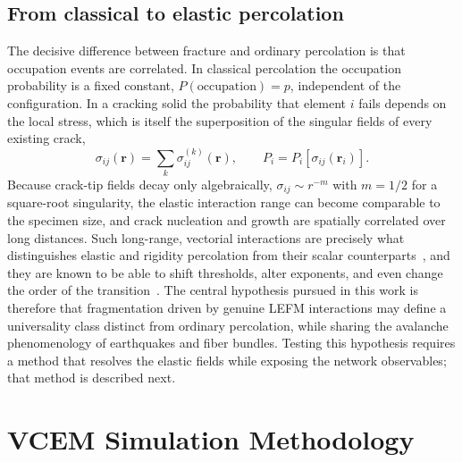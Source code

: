 \documentclass[preprint,12pt]{elsarticle}
\begin{document}
\subsection{From classical to elastic percolation}
\label{sec:elastic-perc}

The decisive difference between fracture and ordinary percolation is that occupation
events are correlated. In classical percolation the occupation probability is a fixed
constant, $P(\text{occupation}) = p$, independent of the configuration. In a cracking
solid the probability that element $i$ fails depends on the local stress, which is
itself the superposition of the singular fields of every existing crack,
\begin{equation}
\sigma_{ij}(\mathbf{r}) = \sum_k \sigma_{ij}^{(k)}(\mathbf{r}), \qquad
P_i = P_i\!\left[\sigma_{ij}(\mathbf{r}_i)\right].
\label{eq:correlated-occ}
\end{equation}
Because crack-tip fields decay only algebraically, $\sigma_{ij} \sim r^{-m}$ with
$m = 1/2$ for a square-root singularity, the elastic interaction range can become
comparable to the specimen size, and crack nucleation and growth are spatially
correlated over long distances. Such long-range, vectorial interactions are precisely
what distinguishes elastic and rigidity percolation from their scalar
counterparts~\cite{FengSen1984,KantorWebman1984,JacobsThorpe1995}, and they are known
to be able to shift thresholds, alter exponents, and even change the order of the
transition~\cite{ZapperiRayStanleyVespignani1997,AlavaNukalaZapperi2006}. The central
hypothesis pursued in this work is therefore that fragmentation driven by genuine
LEFM interactions may define a universality class distinct from ordinary percolation,
while sharing the avalanche phenomenology of earthquakes and fiber bundles. Testing
this hypothesis requires a method that resolves the elastic fields while exposing the
network observables; that method is described next.

\section{VCEM Simulation Methodology}
\label{sec:vcem}
\end{document}
